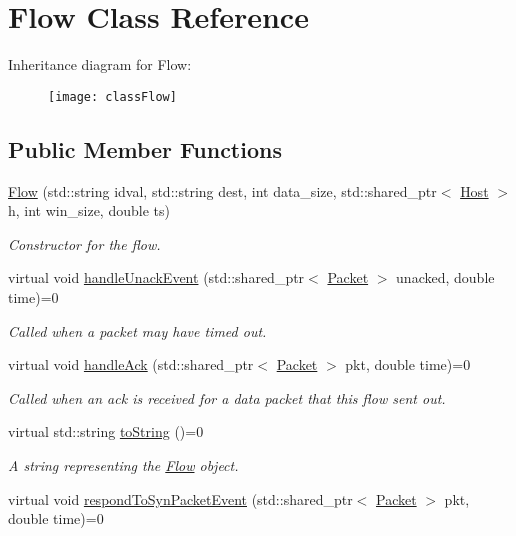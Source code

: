 \hypertarget{classFlow}{\section{\-Flow \-Class \-Reference}
\label{classFlow}
}
\-Inheritance diagram for \-Flow\-:\begin{figure}[H]
\begin{center}
\leavevmode
\texttt{[image: classFlow]}
\end{center}
\end{figure}
\subsection*{\-Public \-Member \-Functions}
\begin{DoxyCompactItemize}
\item 
\hyperlink{classFlow_a3328ae5f608e4e9b23635617bea6f016}{\-Flow} (std\-::string idval, std\-::string dest, int data\-\_\-size, std\-::shared\-\_\-ptr$<$ \hyperlink{classHost}{\-Host} $>$ h, int win\-\_\-size, double ts)
\begin{DoxyCompactList}\small\item\em \-Constructor for the flow. \end{DoxyCompactList}\item 
virtual void \hyperlink{classFlow_a8a45fd871502fad3fb23987ac773a0ab}{handle\-Unack\-Event} (std\-::shared\-\_\-ptr$<$ \hyperlink{classPacket}{\-Packet} $>$ unacked, double time)=0
\begin{DoxyCompactList}\small\item\em \-Called when a packet may have timed out. \end{DoxyCompactList}\item 
virtual void \hyperlink{classFlow_ab75994d89f53573e60a1650dcaeddabb}{handle\-Ack} (std\-::shared\-\_\-ptr$<$ \hyperlink{classPacket}{\-Packet} $>$ pkt, double time)=0
\begin{DoxyCompactList}\small\item\em \-Called when an ack is received for a data packet that this flow sent out. \end{DoxyCompactList}\item 
virtual std\-::string \hyperlink{classFlow_aa74099113ee1c2298874b85ade05be98}{to\-String} ()=0
\begin{DoxyCompactList}\small\item\em \-A string representing the \hyperlink{classFlow}{\-Flow} object. \end{DoxyCompactList}\item 
\hypertarget{classFlow_a1b9f70de92594ba82c5a1b16298f3811}{virtual void \hyperlink{classFlow_a1b9f70de92594ba82c5a1b16298f3811}{respond\-To\-Syn\-Packet\-Event} (std\-::shared\-\_\-ptr$<$ \hyperlink{classPacket}{\-Packet} $>$ pkt, double time)=0}\label{classFlow_a1b9f70de92594ba82c5a1b16298f3811}


\end{DoxyCompactItemize}
